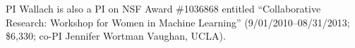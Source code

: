 PI Wallach is also a PI on NSF Award \#1036868 entitled
``Collaborative Research: Workshop for Women in Machine Learning''
(9/01/2010--08/31/2013; \$6,330; co-PI Jennifer Wortman Vaughan,
UCLA).

